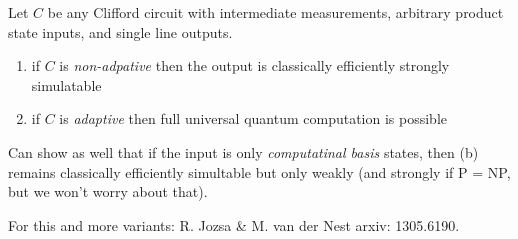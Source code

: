 \documentclass[]{article}
\renewcommand{\it}[1]{\textit{#1}}
\begin{document}
\begin{theorem*}
	Let $C$ be any Clifford circuit with intermediate measurements, arbitrary product state inputs, and single line outputs.
	\begin{enumerate}[label=(\alph*)]
		\item if $C$ is \emph{non-adpative} then the output is classically efficiently strongly simulatable
		\item if $C$ is \emph{adaptive} then full universal quantum computation is possible
	\end{enumerate}
\end{theorem*}
\begin{remark*}
	Can show as well that if the input is only \it{computatinal basis} states, then (b) remains classically efficiently simultable but only weakly (and strongly if P = NP, but we won't worry about that).

	For this and more variants: R. Jozsa \& M. van der Nest arxiv: 1305.6190.
\end{remark*}
\end{document}
